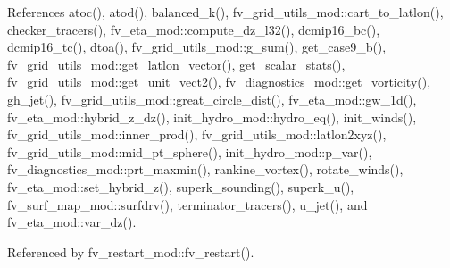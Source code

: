 References atoc(), atod(), balanced\-\_\-k(), fv\-\_\-grid\-\_\-utils\-\_\-mod\-::cart\-\_\-to\-\_\-latlon(), checker\-\_\-tracers(), fv\-\_\-eta\-\_\-mod\-::compute\-\_\-dz\-\_\-l32(), dcmip16\-\_\-bc(), dcmip16\-\_\-tc(), dtoa(), fv\-\_\-grid\-\_\-utils\-\_\-mod\-::g\-\_\-sum(), get\-\_\-case9\-\_\-b(), fv\-\_\-grid\-\_\-utils\-\_\-mod\-::get\-\_\-latlon\-\_\-vector(), get\-\_\-scalar\-\_\-stats(), fv\-\_\-grid\-\_\-utils\-\_\-mod\-::get\-\_\-unit\-\_\-vect2(), fv\-\_\-diagnostics\-\_\-mod\-::get\-\_\-vorticity(), gh\-\_\-jet(), fv\-\_\-grid\-\_\-utils\-\_\-mod\-::great\-\_\-circle\-\_\-dist(), fv\-\_\-eta\-\_\-mod\-::gw\-\_\-1d(), fv\-\_\-eta\-\_\-mod\-::hybrid\-\_\-z\-\_\-dz(), init\-\_\-hydro\-\_\-mod\-::hydro\-\_\-eq(), init\-\_\-winds(), fv\-\_\-grid\-\_\-utils\-\_\-mod\-::inner\-\_\-prod(), fv\-\_\-grid\-\_\-utils\-\_\-mod\-::latlon2xyz(), fv\-\_\-grid\-\_\-utils\-\_\-mod\-::mid\-\_\-pt\-\_\-sphere(), init\-\_\-hydro\-\_\-mod\-::p\-\_\-var(), fv\-\_\-diagnostics\-\_\-mod\-::prt\-\_\-maxmin(), rankine\-\_\-vortex(), rotate\-\_\-winds(), fv\-\_\-eta\-\_\-mod\-::set\-\_\-hybrid\-\_\-z(), superk\-\_\-sounding(), superk\-\_\-u(), fv\-\_\-surf\-\_\-map\-\_\-mod\-::surfdrv(), terminator\-\_\-tracers(), u\-\_\-jet(), and fv\-\_\-eta\-\_\-mod\-::var\-\_\-dz().



Referenced by fv\-\_\-restart\-\_\-mod\-::fv\-\_\-restart().

